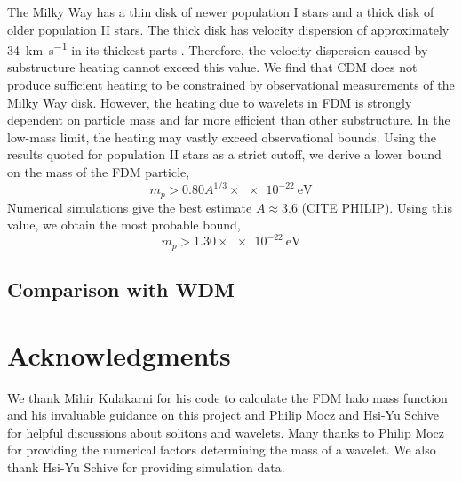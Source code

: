 \documentclass[usenatbib]{mnras}
\begin{document}
	The Milky Way has a thin disk of newer population I stars and a thick disk of older population II stars. The thick disk has velocity dispersion of approximately \SI{34}{\kilo\meter\per\second} in its thickest parts \citep{milky_way}. Therefore, the velocity dispersion caused by substructure heating cannot exceed this value. We find that CDM does not produce sufficient heating to be constrained by observational measurements of the Milky Way disk. However, the heating due to wavelets in FDM is strongly dependent on particle mass and far more efficient than other substructure. In the low-mass limit, the heating may vastly exceed observational bounds. Using the results quoted for population II stars as a strict cutoff, we derive a lower bound on the mass of the FDM particle,
\begin{equation}
m_p > 0.80 A^{1/3} \times \SI{e-22}{\electronvolt}
\end{equation}
Numerical simulations give the best estimate $A \approx 3.6$ (CITE PHILIP). Using this value, we obtain the most probable bound,
\[ m_p > 1.30 \times \SI{e-22}{\electronvolt} \]

\subsection{Comparison with WDM}

\section*{Acknowledgments}
We thank Mihir Kulakarni for his code to calculate the FDM halo mass function and his invaluable guidance on this project and Philip Mocz and Hsi-Yu Schive for helpful discussions about solitons and wavelets. Many thanks to Philip Mocz for providing the numerical factors determining the mass of a wavelet. We also thank Hsi-Yu Schive for providing simulation data. 




 
\end{document}
